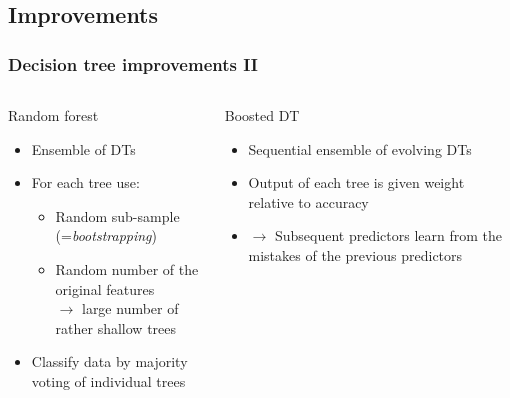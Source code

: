 \documentclass{beamer}
\begin{document}

\subsection{Improvements}
\begin{frame}
    \frametitle{Decision tree improvements II}
    \begin{columns}[T] %
        \begin{column}{.48\textwidth}
            \begin{block}{Random forest}
                \begin{itemize}
                    \item<1-> Ensemble of DTs
                    \item<2-> For each tree use:
                    \begin{itemize}
                        \item<3-> Random sub-sample (=\emph{bootstrapping})
                        \item<4-> Random number of the original features\\
                                  $\to$ large number of rather shallow trees
                    \end{itemize}
                    \item<5-> Classify data by majority voting of individual trees
                \end{itemize}
            \end{block}
        \end{column}%
        \hfill%
        \begin{column}{.48\textwidth}
            \begin{block}{Boosted DT}
                \begin{itemize}
                    \item<6-> Sequential ensemble of evolving DTs
                    \item<7-> Output of each tree is given weight relative to accuracy
                    \item<8-> $\to$ Subsequent predictors learn from the mistakes of the previous predictors
                \end{itemize}
            \end{block}            
        \end{column}%
    \end{columns}

\end{frame}
\end{document}
